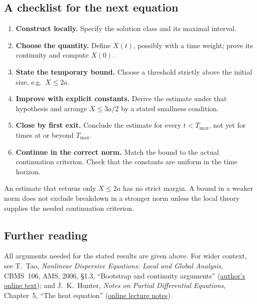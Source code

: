 \documentclass[a4paper,10pt]{article}
\numberwithin{equation}{section}
\theoremstyle{definition}
\theoremstyle{remark}
\newcommand{\Tmax}{T_{\max}}
\begin{document}
\subsection*{A checklist for the next equation}
\begin{enumerate}
\item \textbf{Construct locally.} Specify the solution class and its maximal interval.
\item \textbf{Choose the quantity.} Define $X(t)$, possibly with a time weight;
prove its continuity and compute $X(0)$.
\item \textbf{State the temporary bound.} Choose a threshold strictly above
the initial size, e.g.\ $X\leq2a$.
\item \textbf{Improve with explicit constants.} Derive the estimate under
that hypothesis and arrange $X\leq3a/2$ by a stated smallness condition.
\item \textbf{Close by first exit.} Conclude the estimate for every
$t<\Tmax$, not yet for times at or beyond $\Tmax$.
\item \textbf{Continue in the correct norm.} Match the bound to the actual
continuation criterion. Check that the constants are uniform in the time horizon.
\end{enumerate}
An estimate that returns only $X\leq2a$ has no strict margin. A bound in a
weaker norm does not exclude breakdown in a stronger norm unless the local
theory supplies the needed continuation criterion.

\subsection*{Further reading}
All arguments needed for the stated results are given above. For wider context,
see T.~Tao, \emph{Nonlinear Dispersive Equations: Local and Global Analysis},
CBMS~106, AMS, 2006, \S1.3, ``Bootstrap and continuity arguments''
(\href{https://www.math.ucla.edu/~tao/preprints/chapter.pdf}{author's online text});
and J.~K.~Hunter, \emph{Notes on Partial Differential Equations}, Chapter~5,
``The heat equation''
(\href{https://www.math.ucdavis.edu/~hunter/pdes/ch5.pdf}{online lecture notes}).
\end{document}

